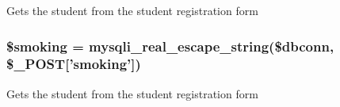 \-Gets the student from the student registration form \hypertarget{admin__view_2validate_2studentVal_8php_a266c5c8c450a524f2b62297da83a6461}{
\subsubsection[{\$smoking}]{\setlength{\rightskip}{0pt plus 5cm}\$smoking = mysqli\-\_\-real\-\_\-escape\-\_\-string(\$dbconn, \$\-\_\-\-P\-O\-S\-T\mbox{[}'smoking'\mbox{]})}}\label{admin__view_2validate_2studentVal_8php_a266c5c8c450a524f2b62297da83a6461}
\-Gets the student from the student registration form \hypertarget{admin__view_2validate_2studentVal_8php_a047170d6020a882807665812a27e2525}{
}
